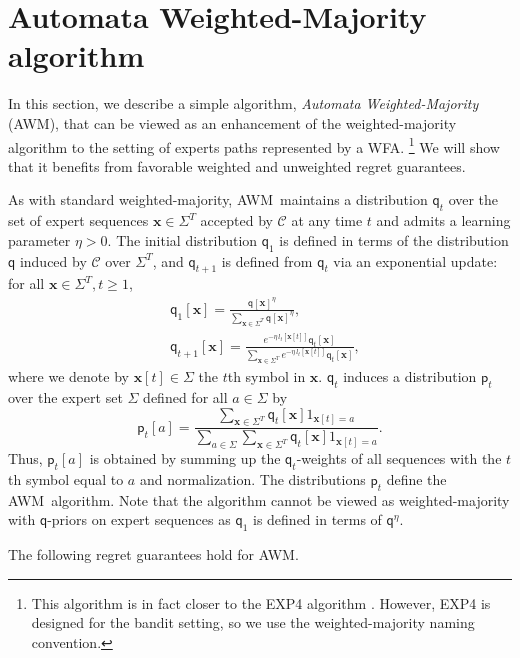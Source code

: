 \documentclass{article}
\newcommand{\sC}{\mathscr C}
\newcommand{\bx}{{\mathbf x}}
\newcommand{\sfp}{{\mathsf p}}
\newcommand{\sfq}{{\mathsf q}}
\newcommand{\AWM}{\textsc{AWM}}
\begin{document}
\section{Automata Weighted-Majority algorithm}
\label{sec:AWM}

In this section, we describe a simple algorithm, \emph{Automata
  Weighted-Majority} (\AWM), that can be viewed as an enhancement of
the weighted-majority algorithm \citep{LittlestoneWarmuth1994} to the
setting of experts paths represented by a WFA. \footnote{This
  algorithm is in fact closer to the EXP4 algorithm
  \citep{AuerCesaBianchiFreundSchapire2002}.  However, EXP4 is
  designed for the bandit setting, so we use the weighted-majority
  naming convention.} We will show that it benefits from favorable
weighted and unweighted regret guarantees.

As with standard weighted-majority, \AWM\ maintains a distribution
$\sfq_t$ over the set of expert sequences $\bx \in \Sigma^T$ accepted
by $\sC$ at any time $t$ and admits a learning parameter $\eta >
0$. The initial distribution $\sfq_1$ is defined in terms of the
distribution $\sfq$ induced by $\sC$ over $\Sigma^T$, and
$\sfq_{t + 1}$ is defined from $\sfq_t$ via an exponential update:
for all $\bx \in \Sigma^T, t \geq 1$,
\begin{align}
  & \sfq_1[\bx] = \frac{\sfq[\bx]^\eta}{\sum_{\bx \in \Sigma^T}
  \sfq[\bx]^\eta}, \nonumber \\
  & \sfq_{t + 1}[\bx] = \frac{e^{-\eta \, l_t[\bx[t]]}\sfq_t[\bx]}{\sum_{\bx
    \in \Sigma^T} e^{-\eta \, l_t[\bx[t]]}\sfq_t[\bx]},
\end{align}
where we denote by $\bx[t] \in \Sigma$ the $t$th symbol in $\bx$.
$\sfq_t$ induces a distribution $\sfp_t$ over the expert set $\Sigma$
defined for all $a \in \Sigma$ by
\begin{equation}
\sfp_t[a] = \frac{\sum_{\bx \in \Sigma^T} \sfq_t[\bx] 1_{\bx[t] =
    a}}{\sum_{a \in \Sigma} \sum_{\bx \in \Sigma^T} \sfq_t[\bx] 1_{\bx[t] = a}}.
\end{equation}
Thus, $\sfp_t[a]$ is obtained by summing up the $\sfq_t$-weights of
all sequences with the $t$th symbol equal to $a$ and normalization.
The distributions $\sfp_t$ define the \AWM\ algorithm. Note that the
algorithm cannot be viewed as weighted-majority with $\sfq$-priors on
expert sequences as $\sfq_1$ is defined in terms of $\sfq^\eta$.

The following regret guarantees hold for \AWM.
\end{document}
